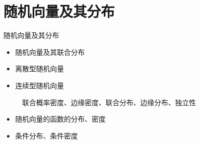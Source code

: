 \section{随机向量及其分布}
    
    \frame{\sectionpage}
    
\begin{frame}{随机向量及其分布}
\begin{itemize}
	\item 随机向量及其联合分布
	\item 离散型随机向量
	\item 连续型随机向量
	
	$\quad$联合概率密度、边缘密度、联合分布、边缘分布、独立性
	
	\item 随机向量的函数的分布、密度
	\item 条件分布、条件密度
\end{itemize}
\end{frame}
    
